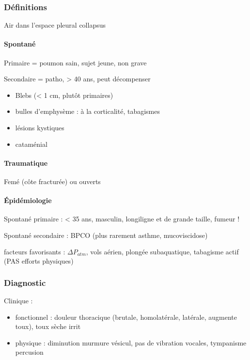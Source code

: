\documentclass[11pt]{article}
\begin{document}
\subsubsection{Définitions}
\label{sec:org852ed6e}
Air dans l'espace pleural \thus collapsus 

\paragraph{Spontané}
\label{sec:org2001f06}
Primaire = poumon sain, sujet jeune, non grave

Secondaire = patho, > 40 ans, peut décompenser


\begin{itemize}
\item Blebs (< 1 cm, plutôt primaires)
\item bulles d'emphysème : à la corticalité, tabagismes
\item lésions kystiques
\item cataménial
\end{itemize}


\paragraph{Traumatique}
\label{sec:org0cadf10}
Femé (côte fracturée) ou ouverts

\paragraph{Épidémiologie}
\label{sec:org100e1fb}
Spontané primaire : < 35 ans, masculin, longiligne et de grande taille, fumeur !

Spontané secondaire : BPCO (plus rarement asthme, mucoviscidose)

facteurs favorisants : \(\Delta P_{atm}\), vols aérien, plongée subaquatique,
tabagisme actif (PAS
efforts physiques)

\subsubsection{Diagnostic}
\label{sec:org1e5e625}
Clinique : 

\begin{itemize}
\item fonctionnel : douleur thoracique (brutale, homolatérale, latérale,
augmente toux), toux sèche irrit
\item physique : diminution murmure vésicul, pas de vibration vocales,
tympanisme percusion
\end{itemize}
\end{document}
